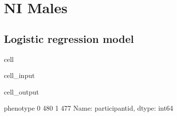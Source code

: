 \documentclass[letterpaper,10pt,english]{jupyterBook}
\begin{document}
\section{NI Males}
\label{\detokenize{Cooper:ni-males}}

\subsection{Logistic regression model}
\label{\detokenize{Cooper:id10}}
\begin{sphinxuseclass}{cell}\begin{sphinxVerbatimInput}

\begin{sphinxuseclass}{cell_input}
\begin{sphinxVerbatim}[commandchars=\\\{\}]
  \PYG{p}{[}    \PYG{p}{]}
  \PYG{p}{[}\PYG{p}{[}\PYG{p}{]}\PYG{p}{]}
  \PYG{p}{[}\PYG{p}{]}
     
\PYG{p}{[}\PYG{p}{]}
\end{sphinxVerbatim}

\end{sphinxuseclass}\end{sphinxVerbatimInput}
\begin{sphinxVerbatimOutput}

\begin{sphinxuseclass}{cell_output}
\begin{sphinxVerbatim}[commandchars=\\\{\}]
phenotype
0    480
1    477
Name: participant\PYGZus{}id, dtype: int64
\end{sphinxVerbatim}

\end{sphinxuseclass}\end{sphinxVerbatimOutput}

\end{sphinxuseclass}
\end{document}
